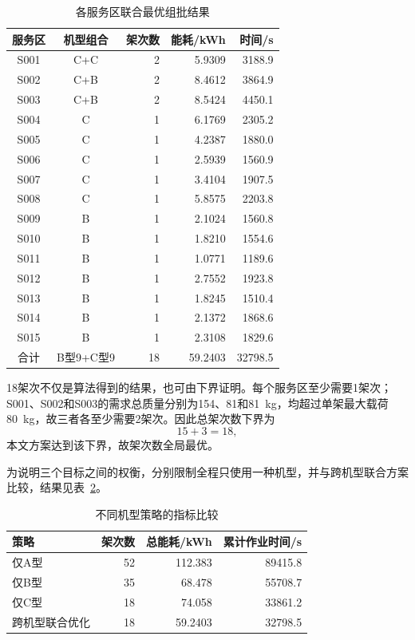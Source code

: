 \begin{table}[htbp]
\centering
\caption{各服务区联合最优组批结果}
\label{tab:q1-plan-summary}
\small
\begin{tabular}{ccrrr}
\toprule
服务区 & 机型组合 & 架次数 & 能耗/kWh & 时间/s\\
\midrule
S001 & C+C & 2 & 5.9309 & 3188.9\\
S002 & C+B & 2 & 8.4612 & 3864.9\\
S003 & C+B & 2 & 8.5424 & 4450.1\\
S004 & C & 1 & 6.1769 & 2305.2\\
S005 & C & 1 & 4.2387 & 1880.0\\
S006 & C & 1 & 2.5939 & 1560.9\\
S007 & C & 1 & 3.4104 & 1907.5\\
S008 & C & 1 & 5.8575 & 2203.8\\
S009 & B & 1 & 2.1024 & 1560.8\\
S010 & B & 1 & 1.8210 & 1554.6\\
S011 & B & 1 & 1.0771 & 1189.6\\
S012 & B & 1 & 2.7552 & 1923.8\\
S013 & B & 1 & 1.8245 & 1510.4\\
S014 & B & 1 & 2.1372 & 1868.6\\
S015 & B & 1 & 2.3108 & 1829.6\\
\midrule
合计 & B型9+C型9 & 18 & 59.2403 & 32798.5\\
\bottomrule
\end{tabular}
\end{table}

18架次不仅是算法得到的结果，也可由下界证明。每个服务区至少需要1架次；S001、S002和S003的需求总质量分别为154、81和81~kg，均超过单架最大载荷80~kg，故三者各至少需要2架次。因此总架次数下界为
\begin{equation}
15+3=18,
\end{equation}
本文方案达到该下界，故架次数全局最优。

为说明三个目标之间的权衡，分别限制全程只使用一种机型，并与跨机型联合方案比较，结果见表~\ref{tab:q1-tradeoff}。

\begin{table}[htbp]
\centering
\caption{不同机型策略的指标比较}
\label{tab:q1-tradeoff}
\begin{tabular}{lrrr}
\toprule
策略 & 架次数 & 总能耗/kWh & 累计作业时间/s\\
\midrule
仅A型 & 52 & 112.383 & 89415.8\\
仅B型 & 35 & 68.478 & 55708.7\\
仅C型 & 18 & 74.058 & 33861.2\\
跨机型联合优化 & 18 & 59.2403 & 32798.5\\
\bottomrule
\end{tabular}
\end{table}

